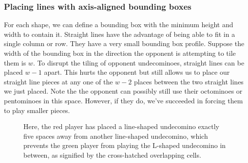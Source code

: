 \documentclass{scrartcl}
\begin{document}
\subsubsection{Placing lines with axis-aligned bounding boxes} %
For each shape, we can define a bounding box with the minimum height and width to contain it. Straight lines have the advantage of being able to fit in a single column or row. They have a very small bounding box profile. Suppose the width of the bounding box in the direction the opponent is attempting to tile them is $w$. To disrupt the tiling of opponent undecominoes, straight lines can be placed $w-1$ apart. This hurts the opponent but still allows us to place our straight line pieces at any one of the $w-2$ places between the two straight lines we just placed. Note the the opponent can possibly still use their octominoes or pentominoes in this space. However, if they do, we've succeeded in forcing them to play smaller pieces.

\begin{figure}[h]
\centering
{}
\caption{Here, the red player has placed a line-shaped undecomino exactly five spaces away from another line-shaped undecomino, which prevents the green player from playing the L-shaped undecomino in between, as signified by the cross-hatched overlapping cells.}\label{fig:aabb1}
\end{figure}
\end{document}
